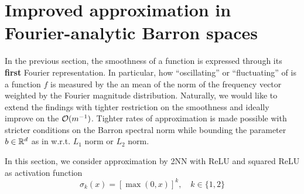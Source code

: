 


\section{Improved approximation in Fourier-analytic Barron spaces}




In the previous section, the smoothness of a function is expressed through its
\textbf{first} Fourier representation. In particular, how ``oscillating'' or
``fluctuating'' of is a function $f$ is measured by the an mean of the norm of
the frequency vector weighted by the Fourier magnitude distribution. Naturally,
we would like to extend the findings with tighter restriction on the smoothness
and ideally improve on the $\mathcal{O}(m^{-1})$. Tighter rates of approximation is
made possible with stricter conditions on the Barron spectral norm while
bounding the parameter $b\in\mathbb{R}^d$ as in \TOCITE w.r.t. $L_1$ norm or $L_2$ norm. 


In this section, we consider approximation by 2NN with ReLU and squared ReLU as
activation function
\begin{equation}
    \sigma_k(x) = [\max(0, x)]^k, \quad k \in \{1, 2\}
\end{equation}

